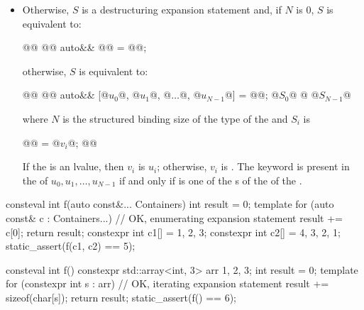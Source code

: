 \begin{itemize}
\item
Otherwise, $S$ is a destructuring expansion statement and,
if $N$ is $0$, $S$ is equivalent to:
\begin{codeblock}
{
  @@
  @@ auto&& @@ = @@;
}
\end{codeblock}
otherwise, $S$ is equivalent to:
\begin{codeblock}
{
  @@
  @@ auto&& [@$u_{0}$@, @$u_{1}$@, @$\dotsc$@, @$u_{N-1}$@] = @@;
  @$S_{0}$@
  @\vdots@
  @$S_{N-1}$@
}
\end{codeblock}
where $N$ is the structured binding size of the type
of the  and $S_{i}$ is
\begin{codeblock}
{
  @@ = @$v_{i}$@;
  @@
}
\end{codeblock}
If the  is an lvalue, then
$v_{i}$ is $u_{i}$;
otherwise, $v_{i}$ is .
The keyword  is present in the 
of $u_{0}, u_{1}, \dotsc, u_{N-1}$ if and only if
 is one of the s
of the 
of the .
\end{itemize}

\pnum
\begin{example}
\begin{codeblock}
consteval int f(auto const&... Containers) {
  int result = 0;
  template for (auto const& c : {Containers...}) {      // OK, enumerating expansion statement
    result += c[0];
  }
  return result;
}
constexpr int c1[] = {1, 2, 3};
constexpr int c2[] = {4, 3, 2, 1};
static_assert(f(c1, c2) == 5);
\end{codeblock}
\end{example}

\pnum
\begin{example}
\begin{codeblock}
consteval int f() {
  constexpr std::array<int, 3> arr {1, 2, 3};
  int result = 0;
  template for (constexpr int s : arr) {                // OK, iterating expansion statement
    result += sizeof(char[s]);
  }
  return result;
}
static_assert(f() == 6);
\end{codeblock}
\end{example}

